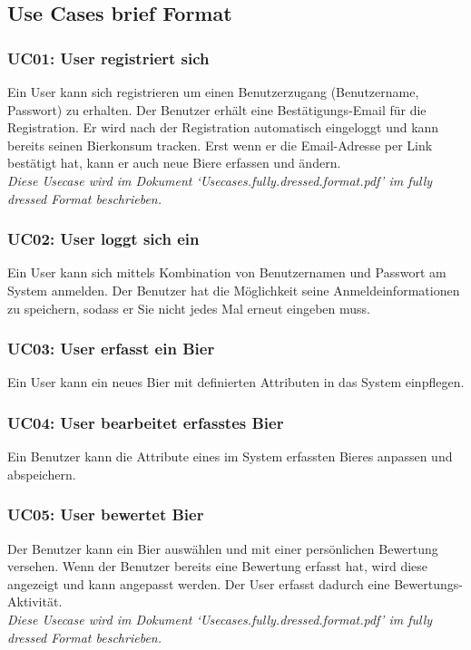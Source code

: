 \documentclass[10pt,a4paper]{scrartcl}
\begin{document}
\subsection{Use Cases brief Format}

\subsubsection*{UC01: User registriert sich}
Ein User kann sich registrieren um einen Benutzerzugang (Benutzername, Passwort) zu erhalten. Der Benutzer erhält eine Bestätigungs-Email für die Registration. Er wird nach der Registration automatisch eingeloggt und kann bereits seinen Bierkonsum tracken. Erst wenn er die Email-Adresse per Link bestätigt hat, kann er auch neue Biere erfassen und ändern.\\
\textit{Diese Usecase wird im Dokument `Usecases.fully.dressed.format.pdf' im fully dressed Format beschrieben.}

\subsubsection*{UC02: User loggt sich ein}
Ein User kann sich mittels Kombination von Benutzernamen und Passwort am System anmelden.
Der Benutzer hat die Möglichkeit seine Anmeldeinformationen zu speichern, sodass er Sie nicht jedes Mal erneut eingeben muss.

\subsubsection*{UC03: User erfasst ein Bier}
Ein User kann ein neues Bier mit definierten Attributen in das System einpflegen.

\subsubsection*{UC04: User bearbeitet erfasstes Bier}
Ein Benutzer kann die Attribute eines im System erfassten Bieres anpassen und abspeichern.
\newpage
\subsubsection*{UC05: User bewertet Bier}
Der Benutzer kann ein Bier auswählen und mit einer persönlichen Bewertung versehen. Wenn der Benutzer bereits eine Bewertung erfasst hat, wird diese angezeigt und kann angepasst werden. Der User erfasst dadurch eine Bewertungs-Aktivität.\\
\textit{Diese Usecase wird im Dokument `Usecases.fully.dressed.format.pdf' im fully dressed Format beschrieben.}
\end{document}
